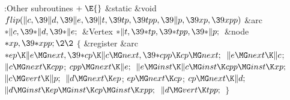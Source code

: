 \Y\B\4:Other subroutines\X${}\mathrel+\E{}$\6
\1\1\&{static} \&{void} ${}\\{flip}(\|c,\39\|d,\39\|e,\39\|t,\39\\{tp},\39%
\\{tpp},\39\|p,\39\\{xp},\39\\{xpp}){}$\6
\&{arc} ${}{*}\|c,\39{*}\|d,\39{*}\|e;{}$\6
\&{Vertex} ${}{*}\|t,\39{*}\\{tp},\39{*}\\{tpp},\39{*}\|p;{}$\6
\&{node} ${}{*}\\{xp},\39{*}\\{xpp};\2\2{}$\6
${}\{{}$\5
\1\&{register} \&{arc} ${}{*}\\{ep}\K\|e\MG\\{next},\39{*}\\{cp}\K\|c\MG%
\\{next},\39{*}\\{cpp}\K\\{cp}\MG\\{next};{}$\7
${}\|e\MG\\{next}\K\|c{}$;\5
${}\|c\MG\\{next}\K\\{cpp}{}$;\5
${}\\{cpp}\MG\\{next}\K\|e;{}$\6
${}\|e\MG\\{inst}\K\|c\MG\\{inst}\K\\{cpp}\MG\\{inst}\K\\{xp};{}$\6
${}\|c\MG\\{vert}\K\|p;{}$\6
${}\|d\MG\\{next}\K\\{ep}{}$;\5
${}\\{ep}\MG\\{next}\K\\{cp}{}$;\5
${}\\{cp}\MG\\{next}\K\|d;{}$\6
${}\|d\MG\\{inst}\K\\{ep}\MG\\{inst}\K\\{cp}\MG\\{inst}\K\\{xpp};{}$\6
${}\|d\MG\\{vert}\K\\{tpp};{}$\6
\4${}\}{}$\2\par
\fi

